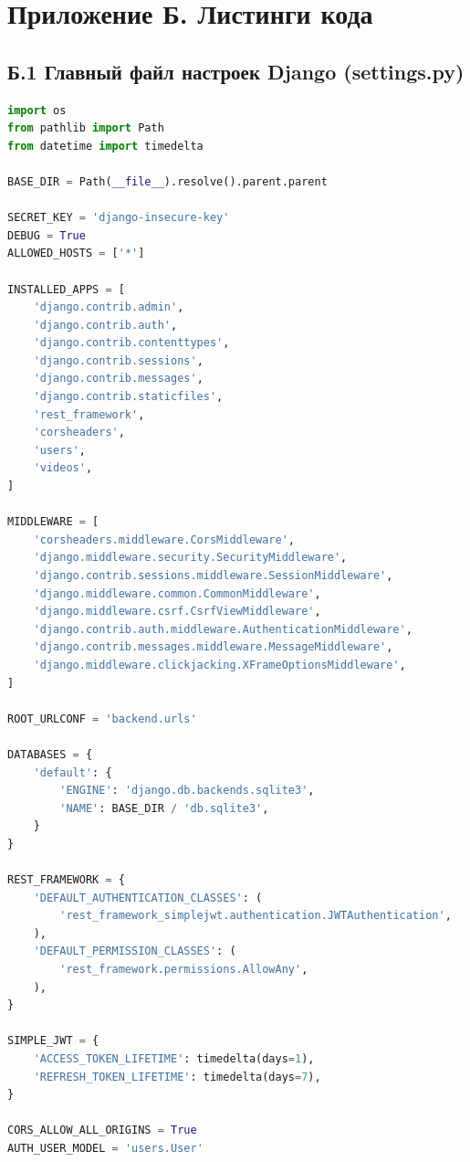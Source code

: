 \documentclass[12pt]{article}
\begin{document}
\newpage

\section*{Приложение Б. Листинги кода}

\subsection*{Б.1 Главный файл настроек Django (settings.py)}

\begin{lstlisting}[language=Python, caption=backend/settings.py]
import os
from pathlib import Path
from datetime import timedelta

BASE_DIR = Path(__file__).resolve().parent.parent

SECRET_KEY = 'django-insecure-key'
DEBUG = True
ALLOWED_HOSTS = ['*']

INSTALLED_APPS = [
    'django.contrib.admin',
    'django.contrib.auth',
    'django.contrib.contenttypes',
    'django.contrib.sessions',
    'django.contrib.messages',
    'django.contrib.staticfiles',
    'rest_framework',
    'corsheaders',
    'users',
    'videos',
]

MIDDLEWARE = [
    'corsheaders.middleware.CorsMiddleware',
    'django.middleware.security.SecurityMiddleware',
    'django.contrib.sessions.middleware.SessionMiddleware',
    'django.middleware.common.CommonMiddleware',
    'django.middleware.csrf.CsrfViewMiddleware',
    'django.contrib.auth.middleware.AuthenticationMiddleware',
    'django.contrib.messages.middleware.MessageMiddleware',
    'django.middleware.clickjacking.XFrameOptionsMiddleware',
]

ROOT_URLCONF = 'backend.urls'

DATABASES = {
    'default': {
        'ENGINE': 'django.db.backends.sqlite3',
        'NAME': BASE_DIR / 'db.sqlite3',
    }
}

REST_FRAMEWORK = {
    'DEFAULT_AUTHENTICATION_CLASSES': (
        'rest_framework_simplejwt.authentication.JWTAuthentication',
    ),
    'DEFAULT_PERMISSION_CLASSES': (
        'rest_framework.permissions.AllowAny',
    ),
}

SIMPLE_JWT = {
    'ACCESS_TOKEN_LIFETIME': timedelta(days=1),
    'REFRESH_TOKEN_LIFETIME': timedelta(days=7),
}

CORS_ALLOW_ALL_ORIGINS = True
AUTH_USER_MODEL = 'users.User'
\end{lstlisting}
\end{document}
